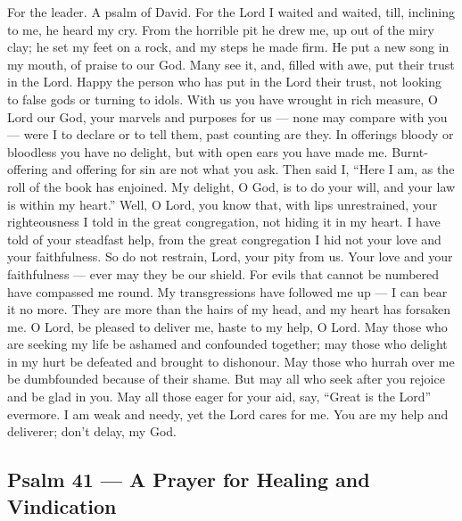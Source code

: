 For the leader. A psalm of David.  For the Lord I waited and
waited, till, inclining to me, he heard my cry.  From the
horrible pit he drew me, up out of the miry clay; he set my feet on a
rock, and my steps he made firm.  He put a new song in my
mouth, of praise to our God. Many see it, and, filled with awe, put
their trust in the Lord.  Happy the person who has put in
the Lord their trust, not looking to false gods or turning to idols.
 With us you have wrought in rich measure, O Lord our God,
your marvels and purposes for us --- none may compare with you --- were
I to declare or to tell them, past counting are they.  In
offerings bloody or bloodless you have no delight, but with open ears
you have made me. Burnt-offering and offering for sin are not what you
ask.  Then said I, ``Here I am, as the roll of the book has
enjoined.  My delight, O God, is to do your will, and your
law is within my heart.''  Well, O Lord, you know that, with
lips unrestrained, your righteousness I told in the great congregation,
 not hiding it in my heart. I have told of your steadfast
help, from the great congregation I hid not your love and your
faithfulness.  So do not restrain, Lord, your pity from us.
Your love and your faithfulness --- ever may they be our shield.
 For evils that cannot be numbered have compassed me round.
My transgressions have followed me up --- I can bear it no more. They
are more than the hairs of my head, and my heart has forsaken me.
 O Lord, be pleased to deliver me, haste to my help, O
Lord.  May those who are seeking my life be ashamed and
confounded together; may those who delight in my hurt be defeated and
brought to dishonour.  May those who hurrah over me be
dumbfounded because of their shame.  But may all who seek
after you rejoice and be glad in you. May all those eager for your aid,
say, ``Great is the Lord'' evermore.  I am weak and needy,
yet the Lord cares for me. You are my help and deliverer; don't delay,
my God.

\hypertarget{psalm-41-a-prayer-for-healing-and-vindication}{%
\subsection{Psalm 41 --- A Prayer for Healing and
Vindication}\label{psalm-41-a-prayer-for-healing-and-vindication}}

